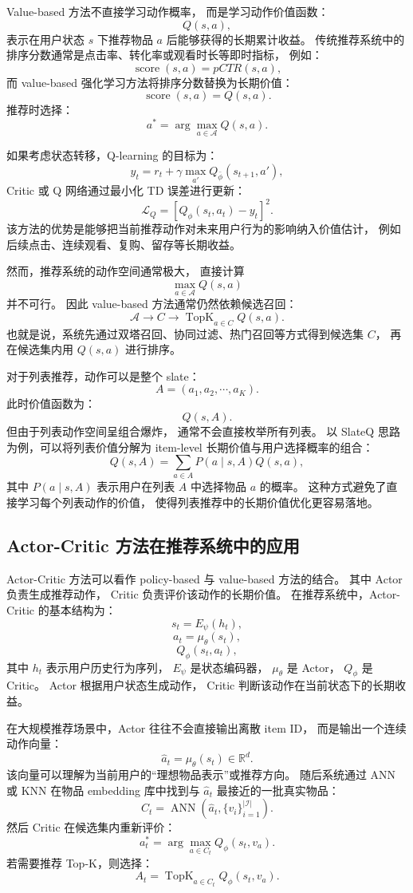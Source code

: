 \documentclass[11pt]{ctexart}
\begin{document}
Value-based 方法不直接学习动作概率，
而是学习动作价值函数：
\[
Q(s,a),
\]
表示在用户状态 \(s\) 下推荐物品 \(a\) 后能够获得的长期累计收益。
传统推荐系统中的排序分数通常是点击率、转化率或观看时长等即时指标，
例如：
\[
\operatorname{score}(s,a)
=
pCTR(s,a),
\]
而 value-based 强化学习方法将排序分数替换为长期价值：
\[
\operatorname{score}(s,a)
=
Q(s,a).
\]
推荐时选择：
\[
a^*
=
\arg\max_{a\in \mathcal{A}} Q(s,a).
\]

如果考虑状态转移，Q-learning 的目标为：
\[
y_t
=
r_t
+
\gamma
\max_{a'}Q_{\bar{\phi}}(s_{t+1},a'),
\]
Critic 或 Q 网络通过最小化 TD 误差进行更新：
\[
\mathcal{L}_{Q}
=
\left[
Q_{\phi}(s_t,a_t)-y_t
\right]^2.
\]
该方法的优势是能够把当前推荐动作对未来用户行为的影响纳入价值估计，
例如后续点击、连续观看、复购、留存等长期收益。

然而，推荐系统的动作空间通常极大，
直接计算
\[
\max_{a\in\mathcal{A}}Q(s,a)
\]
并不可行。
因此 value-based 方法通常仍然依赖候选召回：
\[
\mathcal{A}
\rightarrow
C
\rightarrow
\operatorname{TopK}_{a\in C}Q(s,a).
\]
也就是说，系统先通过双塔召回、协同过滤、热门召回等方式得到候选集 \(C\)，
再在候选集内用 \(Q(s,a)\) 进行排序。

对于列表推荐，动作可以是整个 slate：
\[
A=(a_1,a_2,\cdots,a_K).
\]
此时价值函数为：
\[
Q(s,A).
\]
但由于列表动作空间呈组合爆炸，
通常不会直接枚举所有列表。
以 SlateQ 思路为例，可以将列表价值分解为 item-level 长期价值与用户选择概率的组合：
\[
Q(s,A)
=
\sum_{a\in A}
P(a\mid s,A)Q(s,a),
\]
其中 \(P(a\mid s,A)\) 表示用户在列表 \(A\) 中选择物品 \(a\) 的概率。
这种方式避免了直接学习每个列表动作的价值，
使得列表推荐中的长期价值优化更容易落地。

\subsection{Actor-Critic 方法在推荐系统中的应用}
\label{subsec:actor_critic_recsys}

Actor-Critic 方法可以看作 policy-based 与 value-based 方法的结合。
其中 Actor 负责生成推荐动作，
Critic 负责评价该动作的长期价值。
在推荐系统中，Actor-Critic 的基本结构为：
\[
s_t = E_{\psi}(h_t),
\]
\[
a_t = \mu_{\theta}(s_t),
\]
\[
Q_{\phi}(s_t,a_t),
\]
其中 \(h_t\) 表示用户历史行为序列，
\(E_{\psi}\) 是状态编码器，
\(\mu_{\theta}\) 是 Actor，
\(Q_{\phi}\) 是 Critic。
Actor 根据用户状态生成动作，
Critic 判断该动作在当前状态下的长期收益。

在大规模推荐场景中，Actor 往往不会直接输出离散 item ID，
而是输出一个连续动作向量：
\[
\hat{a}_t
=
\mu_{\theta}(s_t)
\in \mathbb{R}^d.
\]
该向量可以理解为当前用户的``理想物品表示''或推荐方向。
随后系统通过 ANN 或 KNN 在物品 embedding 库中找到与
\(\hat{a}_t\) 最接近的一批真实物品：
\[
C_t
=
\operatorname{ANN}
\left(
\hat{a}_t,\{v_i\}_{i=1}^{|\mathcal{I}|}
\right).
\]
然后 Critic 在候选集内重新评价：
\[
a_t^*
=
\arg\max_{a\in C_t}
Q_{\phi}(s_t,v_a).
\]
若需要推荐 Top-K，则选择：
\[
A_t
=
\operatorname{TopK}_{a\in C_t}
Q_{\phi}(s_t,v_a).
\]
\end{document}
